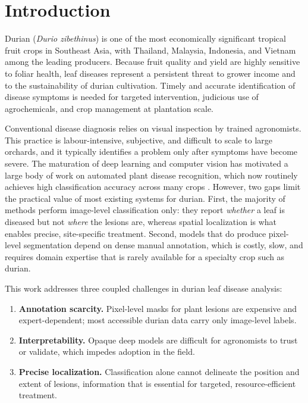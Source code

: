 \documentclass[final,5p,times,twocolumn,authoryear]{elsarticle}
\begin{document}
\section{Introduction}

Durian (\textit{Durio zibethinus}) is one of the most economically significant tropical fruit crops in Southeast Asia, with Thailand, Malaysia, Indonesia, and Vietnam among the leading producers. Because fruit quality and yield are highly sensitive to foliar health, leaf diseases represent a persistent threat to grower income and to the sustainability of durian cultivation. Timely and accurate identification of disease symptoms is needed for targeted intervention, judicious use of agrochemicals, and crop management at plantation scale.

Conventional disease diagnosis relies on visual inspection by trained agronomists. This practice is labour-intensive, subjective, and difficult to scale to large orchards, and it typically identifies a problem only after symptoms have become severe. The maturation of deep learning and computer vision has motivated a large body of work on automated plant disease recognition, which now routinely achieves high classification accuracy across many crops \citep{mohanty2016using, ferentinos2018deep}. However, two gaps limit the practical value of most existing systems for durian. First, the majority of methods perform image-level classification only: they report \emph{whether} a leaf is diseased but not \emph{where} the lesions are, whereas spatial localization is what enables precise, site-specific treatment. Second, models that do produce pixel-level segmentation depend on dense manual annotation, which is costly, slow, and requires domain expertise that is rarely available for a specialty crop such as durian.

This work addresses three coupled challenges in durian leaf disease analysis:
\begin{enumerate}
\item \textbf{Annotation scarcity.} Pixel-level masks for plant lesions are expensive and expert-dependent; most accessible durian data carry only image-level labels.
\item \textbf{Interpretability.} Opaque deep models are difficult for agronomists to trust or validate, which impedes adoption in the field.
\item \textbf{Precise localization.} Classification alone cannot delineate the position and extent of lesions, information that is essential for targeted, resource-efficient treatment.
\end{enumerate}
\end{document}
